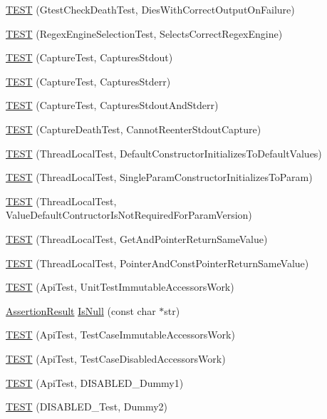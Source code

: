 \begin{DoxyCompactItemize}
\item 
\hyperlink{namespacetesting_1_1internal_afabff70df09a0e4fcda96dd36460c2b9}{T\+E\+ST} (Gtest\+Check\+Death\+Test, Dies\+With\+Correct\+Output\+On\+Failure)
\item 
\hyperlink{namespacetesting_1_1internal_a198f7132f76dd44d48dac54dc5d38fbb}{T\+E\+ST} (Regex\+Engine\+Selection\+Test, Selects\+Correct\+Regex\+Engine)
\item 
\hyperlink{namespacetesting_1_1internal_a0b658d88cea3a2fe6775b1b269c0204b}{T\+E\+ST} (Capture\+Test, Captures\+Stdout)
\item 
\hyperlink{namespacetesting_1_1internal_abbc9510a4f690912c32835213d95198f}{T\+E\+ST} (Capture\+Test, Captures\+Stderr)
\item 
\hyperlink{namespacetesting_1_1internal_a341ff65f3ca44b27fc51f03a9a05bee8}{T\+E\+ST} (Capture\+Test, Captures\+Stdout\+And\+Stderr)
\item 
\hyperlink{namespacetesting_1_1internal_a325a786fb22b87e5aa8d8f584b42ab09}{T\+E\+ST} (Capture\+Death\+Test, Cannot\+Reenter\+Stdout\+Capture)
\item 
\hyperlink{namespacetesting_1_1internal_af366e28e373f36480decc2ea586f48f0}{T\+E\+ST} (Thread\+Local\+Test, Default\+Constructor\+Initializes\+To\+Default\+Values)
\item 
\hyperlink{namespacetesting_1_1internal_a5a52dd578217050e621ebd2aace97a70}{T\+E\+ST} (Thread\+Local\+Test, Single\+Param\+Constructor\+Initializes\+To\+Param)
\item 
\hyperlink{namespacetesting_1_1internal_a6dffc8331590224259b60e855ad07d03}{T\+E\+ST} (Thread\+Local\+Test, Value\+Default\+Contructor\+Is\+Not\+Required\+For\+Param\+Version)
\item 
\hyperlink{namespacetesting_1_1internal_a0e7c2d58a313bec0821df19f44351d84}{T\+E\+ST} (Thread\+Local\+Test, Get\+And\+Pointer\+Return\+Same\+Value)
\item 
\hyperlink{namespacetesting_1_1internal_aaed45d6ba960f02e8d3d042c606bc98e}{T\+E\+ST} (Thread\+Local\+Test, Pointer\+And\+Const\+Pointer\+Return\+Same\+Value)
\item 
\hyperlink{namespacetesting_1_1internal_a9ac879683abb06d1c0bba3a339ea2f40}{T\+E\+ST} (Api\+Test, Unit\+Test\+Immutable\+Accessors\+Work)
\item 
\hyperlink{classtesting_1_1_assertion_result}{Assertion\+Result} \hyperlink{namespacetesting_1_1internal_adcfd37a66bc4cb0e8291cf46e1a6c72b}{Is\+Null} (const char $\ast$str)
\item 
\hyperlink{namespacetesting_1_1internal_a33809333fe5b5f33c2bd56ddcdd1dbb6}{T\+E\+ST} (Api\+Test, Test\+Case\+Immutable\+Accessors\+Work)
\item 
\hyperlink{namespacetesting_1_1internal_a459d693357db8f8f48c26a8bee3ffb84}{T\+E\+ST} (Api\+Test, Test\+Case\+Disabled\+Accessors\+Work)
\item 
\hyperlink{namespacetesting_1_1internal_a9ed5f89c92532506899e3908e79af4de}{T\+E\+ST} (Api\+Test, D\+I\+S\+A\+B\+L\+E\+D\+\_\+\+Dummy1)
\item 
\hyperlink{namespacetesting_1_1internal_a4a84433419426d1c1b87ce998267b0d4}{T\+E\+ST} (D\+I\+S\+A\+B\+L\+E\+D\+\_\+\+Test, Dummy2)
\end{DoxyCompactItemize}
